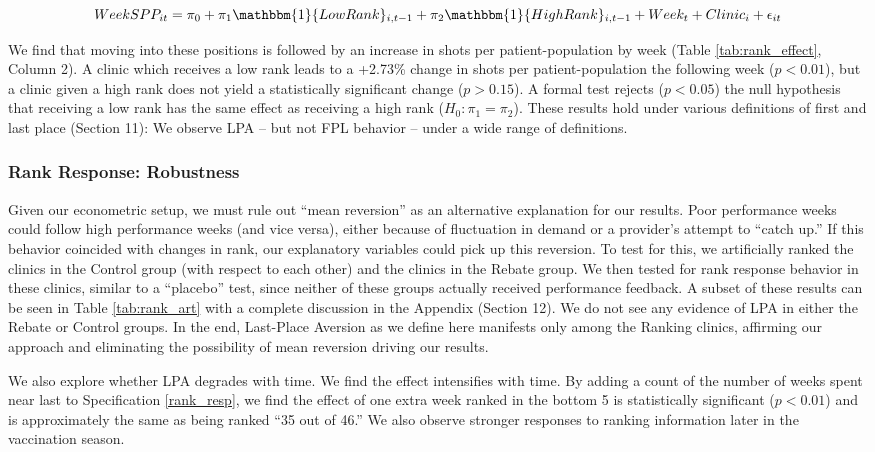 \begin{onehalfspace}
 \begin{equation} \label{rank_resp_ind} %
       WeekSPP_{it} = \pi_0 + \pi_1 \mathbbm{1}\{LowRank\}_{i,t-1} + \pi_2 \mathbbm{1}\{HighRank\}_{i,t-1} + Week_t + Clinic_i + \epsilon_{it}
 \end{equation}  
 
 We find that moving into these positions is followed by an increase in shots per patient-population by week (Table \ref{tab:rank_effect}, Column 2). A clinic which receives a low rank leads to a +2.73\% change in shots per patient-population the following week ($p < 0.01$), but a clinic given a high rank does not yield a statistically significant change ($p > 0.15$). A formal test rejects ($p < 0.05$) the null hypothesis that receiving a low rank has the same effect as receiving a high rank ($H_0: \pi_1 = \pi_2$). These results hold under various definitions of first and last place (Section 11): We observe LPA – but not FPL behavior – under a wide range of definitions. 
 
 \subsubsection{Rank Response: Robustness} \label{rpf_robust}
 Given our econometric setup, we must rule out “mean reversion” as an alternative explanation for our results. Poor performance weeks could follow high performance weeks (and vice versa), either because of fluctuation in demand or a provider’s attempt to “catch up.” If this behavior coincided with changes in rank, our explanatory variables could pick up this reversion. To test for this, we artificially ranked the clinics in the Control group (with respect to each other) and the clinics in the Rebate group. We then tested for rank response behavior in these clinics, similar to a “placebo” test, since neither of these groups actually received performance feedback. A subset of these results can be seen in Table \ref{tab:rank_art} with a complete discussion in the Appendix (Section 12). We do not see any evidence of LPA in either the Rebate or Control groups. In the end, Last-Place Aversion as we define here manifests only among the Ranking clinics, affirming our approach and eliminating the possibility of mean reversion driving our results.
 
 We also explore whether LPA degrades with time. We find the effect intensifies with time. By adding a count of the number of weeks spent near last to Specification \ref{rank_resp}, we find the effect of one extra week ranked in the bottom 5 is statistically significant ($p < 0.01$) and is approximately the same as being ranked “35 out of 46.” We also observe stronger responses to ranking information later in the vaccination season.
 

\end{onehalfspace}
